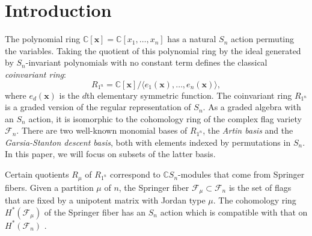 
\theoremstyle{plain} 

\newtheorem*{thm1}{Theorem A}
\newtheorem*{thm2}{Theorem B}
\newtheorem*{prop2}{Proposition C}
\newtheorem*{cor3}{Corollary D}
\newtheorem{axio}[cdrthm]{Axiom}

\theoremstyle{definition}
\newtheorem{alg}[cdrthm]{Algorithm}
\newtheorem{ex}[cdrthm]{Example}

\theoremstyle{remark}

\section{Introduction}
The polynomial ring $\mathbb{C}[\mathbf{x}] = \mathbb{C}[x_1,\dots, x_n]$ has a natural $S_n$ action permuting the variables. 
Taking the quotient of this polynomial ring by the ideal generated by $S_n$-invariant polynomials with no constant term defines the classical \textit{coinvariant ring}:
\[R_{1^n}= \mathbb{C}[\mathbf{x}]/\langle e_1(\mathbf{x}),\dots,  e_n(\mathbf{x})\rangle,\] where $e_d(\mathbf{x})$ is the $d$th elementary symmetric function. 
The coinvariant ring $R_{1^n}$ is a graded version of the regular representation of $S_n$.
As a graded algebra with an $S_n$ action, it is isomorphic to the cohomology ring of the complex flag variety $\mathcal{F}_n$. 
There are two well-known monomial bases of $R_{1^n}$, the \textit{Artin basis} and the \textit{Garsia-Stanton descent basis}, both with elements indexed by permutations in $S_n$. 
In this paper, we will focus on subsets of the latter basis. 
  
Certain quotients $R_\mu$ of $R_{1^n}$ correspond to $\mathbb{C}S_n$-modules that come from Springer fibers. 
Given a partition $\mu$ of $n$, the Springer fiber $\mathcal{F}_\mu\subset \mathcal{F}_n$  is the set of flags that are fixed by a unipotent matrix with Jordan type $\mu$. The cohomology ring $H^{*}(\mathcal{F}_\mu)$ of the Springer fiber has an $S_n$ action which is compatible with that on $H^{*}(\mathcal{F}_n)$ \cite{Springer1978}. 

